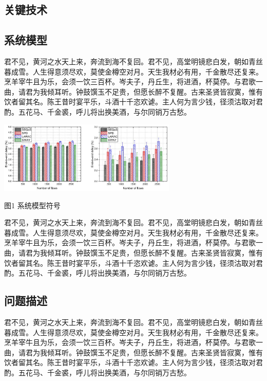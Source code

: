 \documentclass[a4paper, UTF8]{ctexart}
\makeatletter
\newenvironment{figurehere} 
{\def\@captype{figure}}
\makeatother
\begin{document}
\begin{multicols}{2}
	
	\section{关键技术}%
	
	\subsection{系统模型}%
	
	君不见，黄河之水天上来，奔流到海不复回。君不见，高堂明镜悲白发，朝如青丝暮成雪。人生得意须尽欢，莫使金樽空对月。天生我材必有用，千金散尽还复来。烹羊宰牛且为乐，会须一饮三百杯。岑夫子，丹丘生，将进酒，杯莫停。与君歌一曲，请君为我倾耳听。钟鼓馔玉不足贵，但愿长醉不复醒。古来圣贤皆寂寞，惟有饮者留其名。陈王昔时宴平乐，斗酒十千恣欢谑。主人何为言少钱，径须沽取对君酌。五花马、千金裘，呼儿将出换美酒，与尔同销万古愁。
	
	\begin{figurehere}  %
		\centering%
		\includegraphics[width=8.5cm]{3.jpg}
		\label{1}
		\\\centerline{图1 系统模型符号}
	\end{figurehere}%

	君不见，黄河之水天上来，奔流到海不复回。君不见，高堂明镜悲白发，朝如青丝暮成雪。人生得意须尽欢，莫使金樽空对月。天生我材必有用，千金散尽还复来。烹羊宰牛且为乐，会须一饮三百杯。岑夫子，丹丘生，将进酒，杯莫停。与君歌一曲，请君为我倾耳听。钟鼓馔玉不足贵，但愿长醉不复醒。古来圣贤皆寂寞，惟有饮者留其名。陈王昔时宴平乐，斗酒十千恣欢谑。主人何为言少钱，径须沽取对君酌。五花马、千金裘，呼儿将出换美酒，与尔同销万古愁。

	\subsection{问题描述}%
	
	君不见，黄河之水天上来，奔流到海不复回。君不见，高堂明镜悲白发，朝如青丝暮成雪。人生得意须尽欢，莫使金樽空对月。天生我材必有用，千金散尽还复来。烹羊宰牛且为乐，会须一饮三百杯。岑夫子，丹丘生，将进酒，杯莫停。与君歌一曲，请君为我倾耳听。钟鼓馔玉不足贵，但愿长醉不复醒。古来圣贤皆寂寞，惟有饮者留其名。陈王昔时宴平乐，斗酒十千恣欢谑。主人何为言少钱，径须沽取对君酌。五花马、千金裘，呼儿将出换美酒，与尔同销万古愁。
	

\end{multicols}
\end{document}
